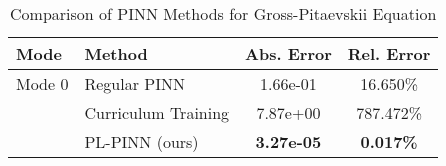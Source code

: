 \begin{table}[htbp]
\centering
\caption{Comparison of PINN Methods for Gross-Pitaevskii Equation}
\label{tab:pinn_comparison}
\begin{tabular}{llcc}
\toprule
Mode & Method & Abs. Error & Rel. Error \\
\midrule
Mode 0 & Regular PINN & 1.66e-01 & 16.650\% \\
 & Curriculum Training & 7.87e+00 & 787.472\% \\
 & PL-PINN (ours) & \textbf{3.27e-05} & \textbf{0.017\%} \\
\bottomrule
\end{tabular}
\end{table}